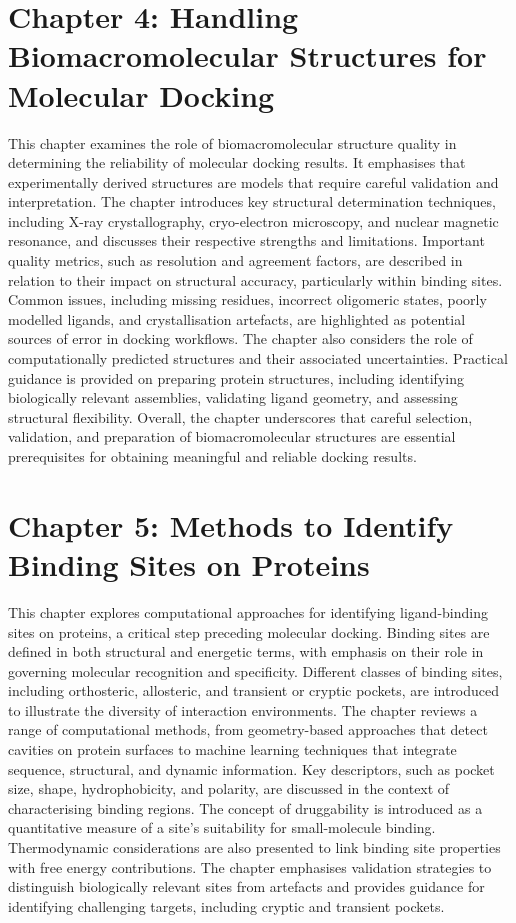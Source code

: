 \documentclass[12pt,a4paper]{article}
\begin{document}
\section*{Chapter 4: Handling Biomacromolecular Structures for Molecular Docking}
This chapter examines the role of biomacromolecular structure quality in determining the reliability of molecular docking results. It emphasises that experimentally derived structures are models that require careful validation and interpretation. The chapter introduces key structural determination techniques, including X-ray crystallography, cryo-electron microscopy, and nuclear magnetic resonance, and discusses their respective strengths and limitations. Important quality metrics, such as resolution and agreement factors, are described in relation to their impact on structural accuracy, particularly within binding sites. Common issues, including missing residues, incorrect oligomeric states, poorly modelled ligands, and crystallisation artefacts, are highlighted as potential sources of error in docking workflows. The chapter also considers the role of computationally predicted structures and their associated uncertainties. Practical guidance is provided on preparing protein structures, including identifying biologically relevant assemblies, validating ligand geometry, and assessing structural flexibility. Overall, the chapter underscores that careful selection, validation, and preparation of biomacromolecular structures are essential prerequisites for obtaining meaningful and reliable docking results.

\section*{Chapter 5: Methods to Identify Binding Sites on Proteins}
This chapter explores computational approaches for identifying ligand-binding sites on proteins, a critical step preceding molecular docking. Binding sites are defined in both structural and energetic terms, with emphasis on their role in governing molecular recognition and specificity. Different classes of binding sites, including orthosteric, allosteric, and transient or cryptic pockets, are introduced to illustrate the diversity of interaction environments. The chapter reviews a range of computational methods, from geometry-based approaches that detect cavities on protein surfaces to machine learning techniques that integrate sequence, structural, and dynamic information. Key descriptors, such as pocket size, shape, hydrophobicity, and polarity, are discussed in the context of characterising binding regions. The concept of druggability is introduced as a quantitative measure of a site’s suitability for small-molecule binding. Thermodynamic considerations are also presented to link binding site properties with free energy contributions. The chapter emphasises validation strategies to distinguish biologically relevant sites from artefacts and provides guidance for identifying challenging targets, including cryptic and transient pockets.
\end{document}
